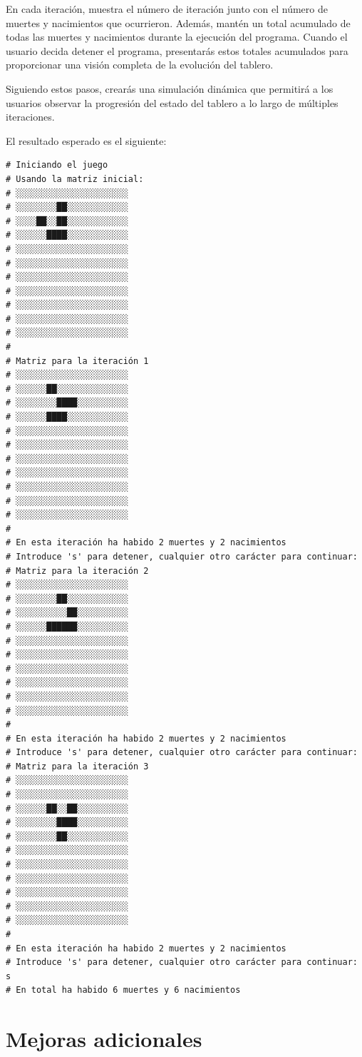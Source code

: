 \documentclass[10pt,a4paper]{article}
\begin{document}
En cada iteración, muestra el número de iteración junto con el número de muertes y nacimientos que ocurrieron. Además, mantén un total acumulado de todas las muertes y nacimientos durante la ejecución del programa. Cuando el usuario decida detener el programa, presentarás estos totales acumulados para proporcionar una visión completa de la evolución del tablero.

Siguiendo estos pasos, crearás una simulación dinámica que permitirá a los usuarios observar la progresión del estado del tablero a lo largo de múltiples iteraciones.

El resultado esperado es el siguiente:

\begin{lstlisting}
# Iniciando el juego
# Usando la matriz inicial:
# ░░░░░░░░░░░░░░░░░░░░░░
# ░░░░░░░░██░░░░░░░░░░░░
# ░░░░██░░██░░░░░░░░░░░░
# ░░░░░░████░░░░░░░░░░░░
# ░░░░░░░░░░░░░░░░░░░░░░
# ░░░░░░░░░░░░░░░░░░░░░░
# ░░░░░░░░░░░░░░░░░░░░░░
# ░░░░░░░░░░░░░░░░░░░░░░
# ░░░░░░░░░░░░░░░░░░░░░░
# ░░░░░░░░░░░░░░░░░░░░░░
# ░░░░░░░░░░░░░░░░░░░░░░
# 
# Matriz para la iteración 1
# ░░░░░░░░░░░░░░░░░░░░░░
# ░░░░░░██░░░░░░░░░░░░░░
# ░░░░░░░░████░░░░░░░░░░
# ░░░░░░████░░░░░░░░░░░░
# ░░░░░░░░░░░░░░░░░░░░░░
# ░░░░░░░░░░░░░░░░░░░░░░
# ░░░░░░░░░░░░░░░░░░░░░░
# ░░░░░░░░░░░░░░░░░░░░░░
# ░░░░░░░░░░░░░░░░░░░░░░
# ░░░░░░░░░░░░░░░░░░░░░░
# ░░░░░░░░░░░░░░░░░░░░░░
# 
# En esta iteración ha habido 2 muertes y 2 nacimientos
# Introduce 's' para detener, cualquier otro carácter para continuar: 
# Matriz para la iteración 2
# ░░░░░░░░░░░░░░░░░░░░░░
# ░░░░░░░░██░░░░░░░░░░░░
# ░░░░░░░░░░██░░░░░░░░░░
# ░░░░░░██████░░░░░░░░░░
# ░░░░░░░░░░░░░░░░░░░░░░
# ░░░░░░░░░░░░░░░░░░░░░░
# ░░░░░░░░░░░░░░░░░░░░░░
# ░░░░░░░░░░░░░░░░░░░░░░
# ░░░░░░░░░░░░░░░░░░░░░░
# ░░░░░░░░░░░░░░░░░░░░░░
#
# En esta iteración ha habido 2 muertes y 2 nacimientos
# Introduce 's' para detener, cualquier otro carácter para continuar: 
# Matriz para la iteración 3
# ░░░░░░░░░░░░░░░░░░░░░░
# ░░░░░░░░░░░░░░░░░░░░░░
# ░░░░░░██░░██░░░░░░░░░░
# ░░░░░░░░████░░░░░░░░░░
# ░░░░░░░░██░░░░░░░░░░░░
# ░░░░░░░░░░░░░░░░░░░░░░
# ░░░░░░░░░░░░░░░░░░░░░░
# ░░░░░░░░░░░░░░░░░░░░░░
# ░░░░░░░░░░░░░░░░░░░░░░
# ░░░░░░░░░░░░░░░░░░░░░░
# ░░░░░░░░░░░░░░░░░░░░░░
# 
# En esta iteración ha habido 2 muertes y 2 nacimientos
# Introduce 's' para detener, cualquier otro carácter para continuar: s
# En total ha habido 6 muertes y 6 nacimientos
\end{lstlisting}

\section{Mejoras adicionales}
\label{sec:improve}
\end{document}
